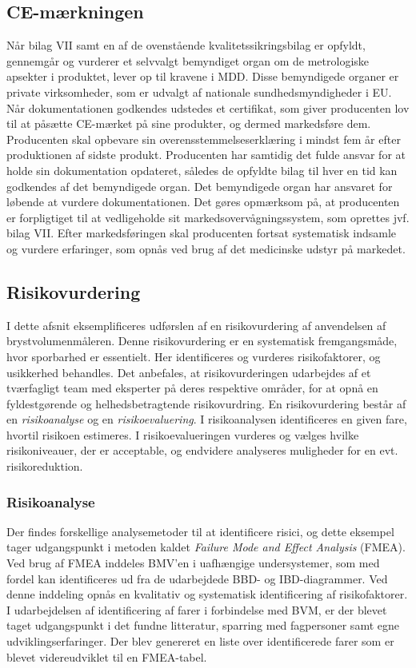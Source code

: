 \subsection{CE-mærkningen}
   
Når bilag VII samt en af de ovenstående kvalitetssikringsbilag er opfyldt, gennemgår og vurderer et selvvalgt bemyndiget organ om de metrologiske apsekter i produktet, lever op til kravene i MDD. Disse bemyndigede organer er private virksomheder, som er udvalgt af nationale sundhedsmyndigheder i EU. Når dokumentationen godkendes udstedes et certifikat, som giver producenten lov til at påsætte CE-mærket på sine produkter, og dermed markedsføre dem.    
 Producenten skal opbevare sin overensstemmelseserklæring i mindst fem år efter produktionen af sidste produkt. Producenten har samtidig det fulde ansvar for at holde sin dokumentation opdateret, således de opfyldte bilag til hver en tid kan godkendes af det bemyndigede organ. Det bemyndigede organ har ansvaret for løbende at vurdere dokumentationen.
Det gøres opmærksom på, at producenten er forpligtiget til at vedligeholde sit markedsovervågningssystem, som oprettes jvf. bilag VII. Efter markedsføringen skal producenten fortsat systematisk indsamle og vurdere erfaringer, som opnås ved brug af det medicinske udstyr på markedet. 

\subsection{Risikovurdering}
I dette afsnit eksemplificeres udførslen af en risikovurdering af anvendelsen af brystvolumenmåleren. Denne risikovurdering er en systematisk fremgangsmåde, hvor sporbarhed er essentielt. Her identificeres og vurderes risikofaktorer, og usikkerhed behandles. 
Det anbefales, at risikovurderingen udarbejdes af et tværfagligt team med eksperter på deres respektive områder, for at opnå en fyldestgørende og helhedsbetragtende risikovurdring.   
En risikovurdering består af en \textit{risikoanalyse} og en \textit{risikoevaluering}. I risikoanalysen identificeres en given fare, hvortil risikoen estimeres. I risikoevalueringen vurderes og vælges hvilke risikoniveauer, der er acceptable, og endvidere analyseres muligheder for en evt. risikoreduktion.

	\subsubsection{Risikoanalyse}
	Der findes forskellige analysemetoder til at identificere risici, og dette eksempel tager udgangspunkt i metoden kaldet \textit{Failure Mode and Effect Analysis}{} (FMEA). Ved brug af FMEA inddeles BMV'en i uafhængige undersystemer, som med fordel kan identificeres ud fra de udarbejdede BBD- og IBD-diagrammer. Ved denne inddeling opnås en kvalitativ og systematisk identificering af risikofaktorer.
	I udarbejdelsen af identificering af farer i forbindelse med BVM, er der blevet taget udgangspunkt i det fundne litteratur, sparring med fagpersoner samt egne udviklingserfaringer. Der blev genereret en liste over identificerede farer som er blevet videreudviklet til en FMEA-tabel.  
	
